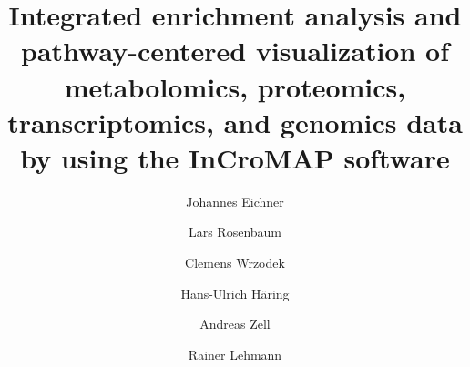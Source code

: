 \documentclass[final,5p,times,twocolumn]{elsarticle}
\newcommand\red[1]{{\color{red}#1}}
\begin{document}
\begin{frontmatter}



\title{\red{Integrated enrichment analysis and pathway-centered visualization of metabolomics, proteomics, transcriptomics, and genomics data by using the InCroMAP software}}


\author[uni]{Johannes Eichner}
\author[uni]{Lars Rosenbaum}
\author[uni]{Clemens Wrzodek}
\author[idm,endo,dzd]{Hans-Ulrich H\"aring}
\author[uni]{Andreas Zell}
\author[idm,zentrallabor,dzd]{Rainer Lehmann}
\address[uni]{Center for Bioinformatics, University of T\"ubingen, T\"ubingen, Germany}
\address[idm]{Institute for Diabetes Research and Metabolic Diseases of the Helmholtz Centre Munich at the University of T\"ubingen, T\"ubingen, Germany}
\address[endo]{Division of Endocrinology, Diabetology, Vascular Medicine, Nephrology and Clinical Chemistry, Department of Internal Medicine IV, University Hospital T\"ubingen, T\"ubingen, Germany}
\address[zentrallabor]{Division of Clinical Chemistry and Pathobiochemistry, Department of Internal Medicine IV, University Hospital T\"ubingen, T\"ubingen, Germany}
\address[dzd]{German Center for Diabetes Research (DZD), Germany}



\end{frontmatter}
\end{document}
